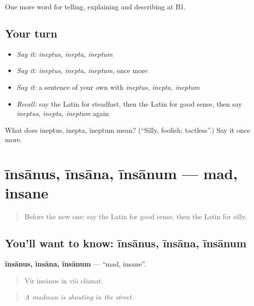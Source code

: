 \begin{grammarlens}[title={What you've built}]
One more word for telling, explaining and describing at B1.
\end{grammarlens}

\subsection*{Your turn}
\begin{itemize}
\raggedright
  \item \emph{Say it:} \emph{ineptus, inepta, ineptum}
  \item \emph{Say it:} \emph{ineptus, inepta, ineptum}, once more
  \item \emph{Say it:} a sentence of your own with \emph{ineptus, inepta, ineptum}
  \item \emph{Recall:} say the Latin for steadfast, then the Latin for good sense, then say \emph{ineptus, inepta, ineptum} again
\end{itemize}

\begin{tcolorbox}[breakable,colback=teal!4,colframe=teal!35!black,title={Before you move on}]
What does ineptus, inepta, ineptum mean? (\textquotedblleft{}Silly, foolish; tactless\textquotedblright{}.) Say it once more.
\end{tcolorbox}
\section[īnsānus, īnsāna, īnsānum]{īnsānus, īnsāna, īnsānum — mad, insane}

\label{lesson:LA-C510-insanus}



\begin{quote}
Before the new one: say the Latin for good sense, then the Latin for silly.
\end{quote}

\subsection*{You'll want to know: īnsānus, īnsāna, īnsānum}
\textbf{īnsānus, īnsāna, īnsānum} — \textquotedblleft{}mad, insane\textquotedblright{}.

\begin{quote}
Vir īnsānus in viā clāmat.
\end{quote}

\begin{quote}
\emph{A madman is shouting in the street.}
\end{quote}

